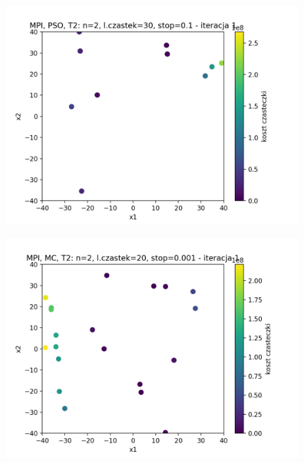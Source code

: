 \documentclass[11pt, a4paper, oneside]{article}
\begin{document}
\begin{figure}[H]
\begin{minipage}[b]{\dimexpr.5\textwidth-1em}
  \label{fig:pozycjeStartowe:MC1}
\end{minipage}
\end{figure}

\begin{figure}[H]
\centering
\begin{minipage}[b]{\dimexpr.5\textwidth-1em}
  \centering
  \includegraphics[width=1\linewidth]{grafiki/MPI_PSO_T2/MPI_PSO_T2_startPositions.png}
  \label{fig:pozycjeStartowe:PSO2}
\end{minipage} \hfill
\begin{minipage}[b]{\dimexpr.5\textwidth-1em}
  \centering
  \includegraphics[width=1\linewidth]{grafiki/MPI_MC_T2/MPI_MC_T2_startPositions.png}
  \label{fig:pozycjeStartowe:MC2}
\end{minipage}
\end{figure}
\end{document}
